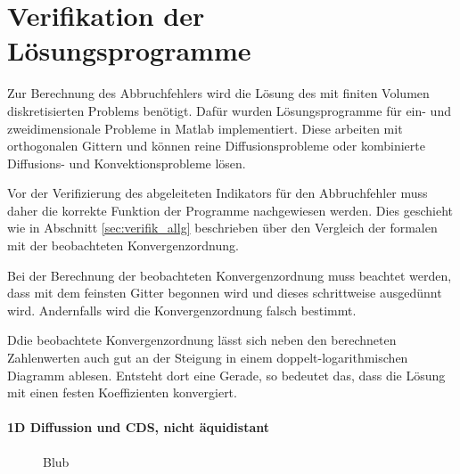 \section{Verifikation der Lösungsprogramme}

Zur Berechnung des Abbruchfehlers wird die Lösung des mit finiten Volumen
diskretisierten Problems benötigt. Dafür wurden Lösungsprogramme
für ein- und zweidimensionale Probleme in Matlab implementiert.
Diese arbeiten mit orthogonalen Gittern und können reine Diffusionsprobleme
oder kombinierte Diffusions- und Konvektionsprobleme lösen.

Vor der Verifizierung des abgeleiteten Indikators für den Abbruchfehler muss daher die
korrekte Funktion der Programme nachgewiesen werden. Dies geschieht wie in Abschnitt
\ref{sec:verifik_allg} beschrieben über den Vergleich der formalen mit der beobachteten
Konvergenzordnung.

Bei der Berechnung der beobachteten Konvergenzordnung muss beachtet werden, dass mit dem
feinsten Gitter begonnen wird und dieses schrittweise ausgedünnt wird. Andernfalls
wird die Konvergenzordnung falsch bestimmt.

Ddie beobachtete Konvergenzordnung lässt sich neben den berechneten Zahlenwerten auch gut
an der Steigung in einem doppelt-logarithmischen Diagramm ablesen. Entsteht dort eine
Gerade, so bedeutet das, dass die Lösung mit einen festen Koeffizienten konvergiert.

\paragraph{1D Diffussion und CDS, nicht äquidistant}


\begin{figure}[ht]
\centering
\caption{Blub}
\end{figure}

